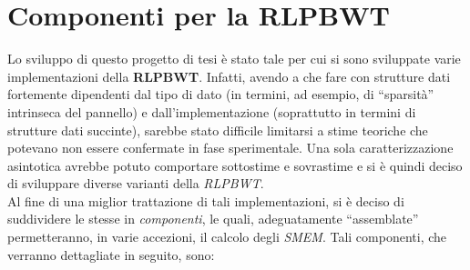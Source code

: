 \section{Componenti per la RLPBWT}
Lo sviluppo di questo progetto di tesi è stato tale per cui si sono sviluppate
varie implementazioni della \textbf{RLPBWT}. Infatti, avendo a che fare con
strutture dati fortemente dipendenti dal tipo di dato (in termini, ad esempio,
di ``sparsità'' intrinseca del pannello) e dall'implementazione (soprattutto in
termini di strutture dati succinte), sarebbe stato difficile limitarsi a stime
teoriche che potevano non essere confermate in fase sperimentale. Una sola
caratterizzazione asintotica avrebbe potuto comportare sottostime e
sovrastime e si è quindi deciso di sviluppare diverse varianti della
\textit{RLPBWT}.\\ 
Al fine di una miglior trattazione di tali implementazioni, si è deciso di
suddividere le stesse in \textit{componenti}, le quali, adeguatamente
``assemblate'' permetteranno, in varie accezioni, il calcolo degli
\textit{SMEM}. Tali componenti, che verranno dettagliate in seguito, sono:
